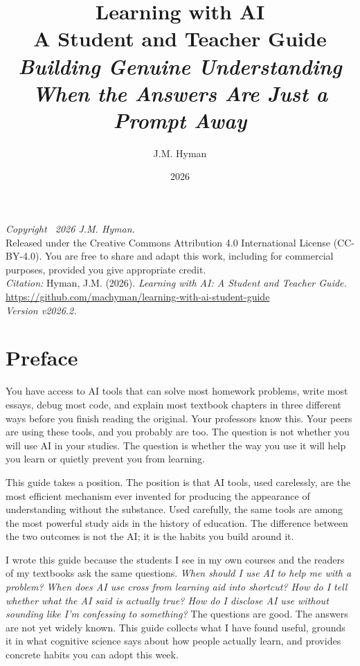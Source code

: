 \documentclass[11pt]{book}
\title{\textbf{Learning with AI}\\[0.5em] \large A Student and Teacher Guide\\[0.3em] \normalsize\textit{Building Genuine Understanding\\When the Answers Are Just a Prompt Away}}
\author{J.M. Hyman}
\date{2026}
\begin{document}
\frontmatter

\maketitle

\vspace*{\fill}
\noindent\textit{Copyright \textcopyright\ 2026 J.M. Hyman.}\\
\noindent Released under the Creative Commons Attribution 4.0 International License (CC-BY-4.0). You are free to share and adapt this work, including for commercial purposes, provided you give appropriate credit.\\[1em]
\noindent \textit{Citation:} Hyman, J.M. (2026). \textit{Learning with AI: A Student and Teacher Guide.} \url{https://github.com/machyman/learning-with-ai-student-guide}\\[1em]
\noindent \textit{Version v2026.2.}
\newpage

\tableofcontents

\chapter*{Preface}

You have access to AI tools that can solve most homework problems, write most essays, debug most code, and explain most textbook chapters in three different ways before you finish reading the original. Your professors know this. Your peers are using these tools, and you probably are too. The question is not whether you will use AI in your studies. The question is whether the way you use it will help you learn or quietly prevent you from learning.

This guide takes a position. The position is that AI tools, used carelessly, are the most efficient mechanism ever invented for producing the appearance of understanding without the substance. Used carefully, the same tools are among the most powerful study aids in the history of education. The difference between the two outcomes is not the AI; it is the habits you build around it.

I wrote this guide because the students I see in my own courses and the readers of my textbooks ask the same questions. \emph{When should I use AI to help me with a problem? When does AI use cross from learning aid into shortcut? How do I tell whether what the AI said is actually true? How do I disclose AI use without sounding like I'm confessing to something?} The questions are good. The answers are not yet widely known. This guide collects what I have found useful, grounds it in what cognitive science says about how people actually learn, and provides concrete habits you can adopt this week.
\end{document}
